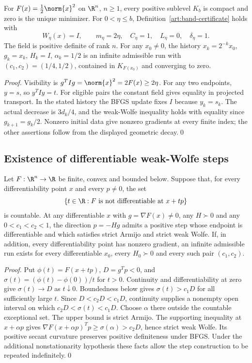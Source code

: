 \begin{proposition}\label{art:examples-full-rank}
For $F(x)=\tfrac12\norm{x}^2$ on $\R^n$, $n\ge1$, every positive sublevel
$K_b$ is compact and zero is the unique minimizer. For $0<\eta\le b$,
Definition~\ref{art:band-certificate} holds with
\[
 W_\eta(x)=I,\qquad m_\eta=2\eta,\quad C_\eta=1,
 \quad L_\eta=0,\quad\delta_\eta=1.
\]
The field is positive definite of rank $n$. For any $x_0\ne0$, the history
$x_k=2^{-k}x_0$, $g_k=x_k$, $H_k=I$, $\alpha_k=1/2$ is an infinite
admissible run with $(c_1,c_2)=(1/4,1/2)$, contained in $K_{F(x_0)}$ and
converging to zero.
\end{proposition}
\begin{proof}
Visibility is $g^TIg=\norm{x}^2=2F(x)\ge2\eta$. For any two endpoints,
$y=s$, so $y^TIy=t$. For eligible pairs the constant field gives equality in projected transport.
In the stated history the BFGS update fixes $I$ because $y_k=s_k$.
The actual decrease is $3d_k/4$, and the weak-Wolfe inequality holds with
equality since $g_{k+1}=g_k/2$. Nonzero initial data give nonzero gradients
at every finite index; the other assertions follow from the displayed
geometric decay.\qed
\end{proof}

\subsection{Existence of differentiable weak-Wolfe steps}

\begin{lemma}\label{art:examples-run-existence}
Let $F:\R^n\to\R$ be finite, convex and bounded below. Suppose that, for
every differentiability point $x$ and every $p\ne0$, the set
\[
 \{t\in\R:F\text{ is not differentiable at }x+tp\}
\]
is countable. At any differentiable $x$ with $g=\nabla F(x)\ne0$, any
$H\succ0$ and any $0<c_1<c_2<1$, the direction $p=-Hg$ admits a positive
step whose endpoint is differentiable and which satisfies strict Armijo
and strict weak Wolfe. If, in addition, every differentiability point has
nonzero gradient, an infinite admissible run exists for every differentiable
$x_0$, every $H_0\succ0$ and every such pair $(c_1,c_2)$.
\end{lemma}
\begin{proof}
Put $\phi(t)=F(x+tp)$, $D=g^Tp<0$, and
$\sigma(t)=(\phi(t)-\phi(0))/t$ for $t>0$.
Continuity and differentiability at zero give $\sigma(t)\to D$ as
$t\downarrow0$. Boundedness below gives $\sigma(t)>c_1D$ for all
sufficiently large $t$. Since $D<c_2D<c_1D$, continuity supplies a
nonempty open interval on which $c_2D<\sigma(t)<c_1D$.
Choose $\alpha$ there outside the countable exceptional set. The upper
bound is strict Armijo. The supporting inequality at $x+\alpha p$ gives
$\nabla F(x+\alpha p)^Tp\ge\sigma(\alpha)>c_2D$, hence strict weak Wolfe.
Its positive secant curvature preserves positive definiteness under BFGS.
Under the additional nonstationarity hypothesis these facts allow the step
construction to be repeated indefinitely.\qed
\end{proof}

